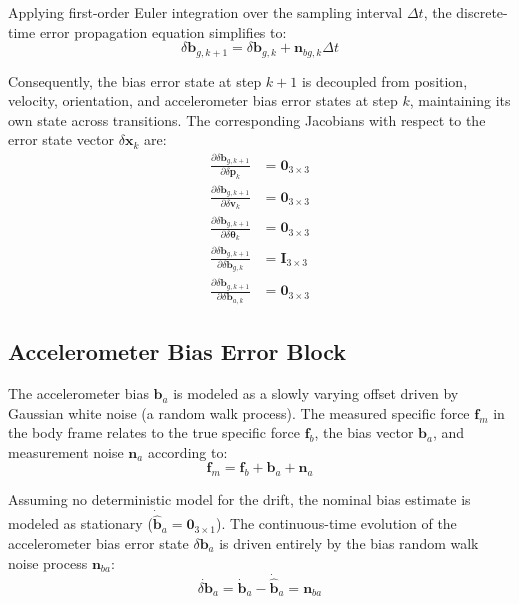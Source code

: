 \documentclass{article}
\begin{document}
	Applying first-order Euler integration over the sampling interval $\Delta t$, the discrete-time error propagation equation simplifies to:
	\begin{equation*}
		\delta\mathbf{b}_{g,k+1} = \delta\mathbf{b}_{g,k} + \mathbf{n}_{bg,k} \Delta t
	\end{equation*}
	
	Consequently, the bias error state at step $k+1$ is decoupled from position, velocity, orientation, and accelerometer bias error states at step $k$, maintaining its own state across transitions. The corresponding Jacobians with respect to the error state vector $\delta\mathbf{x}_k$ are:
	\begin{align*}
		\frac{\partial \delta\mathbf{b}_{g,k+1}}{\partial \delta\mathbf{p}_k} &= \mathbf{0}_{3 \times 3} \\
		\frac{\partial \delta\mathbf{b}_{g,k+1}}{\partial \delta\mathbf{v}_k} &= \mathbf{0}_{3 \times 3} \\
		\frac{\partial \delta\mathbf{b}_{g,k+1}}{\partial \delta\bm{\theta}_k} &= \mathbf{0}_{3 \times 3} \\
		\frac{\partial \delta\mathbf{b}_{g,k+1}}{\partial \delta\mathbf{b}_{g,k}} &= \mathbf{I}_{3 \times 3} \\
		\frac{\partial \delta\mathbf{b}_{g,k+1}}{\partial \delta\mathbf{b}_{a,k}} &= \mathbf{0}_{3 \times 3}
	\end{align*}\textbf{}
	
	\subsection{Accelerometer Bias Error Block}
	The accelerometer bias $\mathbf{b}_a$ is modeled as a slowly varying offset driven by Gaussian white noise (a random walk process). The measured specific force $\mathbf{f}_m$ in the body frame relates to the true specific force $\mathbf{f}_b$, the bias vector $\mathbf{b}_a$, and measurement noise $\mathbf{n}_a$ according to:
	\begin{equation*}
		\mathbf{f}_m = \mathbf{f}_b + \mathbf{b}_a + \mathbf{n}_a
	\end{equation*}
	
	Assuming no deterministic model for the drift, the nominal bias estimate is modeled as stationary ($\dot{\hat{\mathbf{b}}}_a = \mathbf{0}_{3 \times 1}$). The continuous-time evolution of the accelerometer bias error state $\delta\mathbf{b}_a$ is driven entirely by the bias random walk noise process $\mathbf{n}_{ba}$:
	\begin{equation*}
		\dot{\delta\mathbf{b}}_a = \dot{\mathbf{b}}_a - \dot{\hat{\mathbf{b}}}_a = \mathbf{n}_{ba}
	\end{equation*}
	
\end{document}
